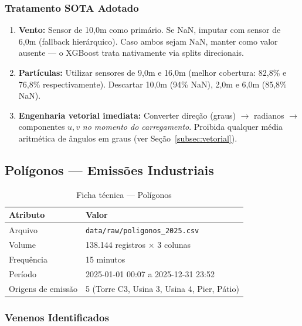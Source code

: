 \documentclass[12pt, a4paper]{article}
\newcommand{\arquivo}[1]{\texttt{#1}}
\begin{document}
\subsubsection{Tratamento SOTA Adotado}

\begin{enumerate}
    \item \textbf{Vento:} Sensor de 10,0m como primário. Se NaN, imputar com
          sensor de 6,0m (fallback hierárquico). Caso ambos sejam NaN, manter
          como valor ausente — o XGBoost trata nativamente via splits
          direcionais.
    \item \textbf{Partículas:} Utilizar sensores de 9,0m e 16,0m (melhor
          cobertura: 82,8\% e 76,8\% respectivamente). Descartar 10,0m (94\%
          NaN), 2,0m e 6,0m (85,8\% NaN).
    \item \textbf{Engenharia vetorial imediata:} Converter direção (graus)
          $\to$ radianos $\to$ componentes $u, v$ \textit{no momento do
          carregamento}. Proibida qualquer média aritmética de ângulos em
          graus (ver Seção~\ref{subsec:vetorial}).
\end{enumerate}

\subsection{Polígonos — Emissões Industriais}
\label{subsec:poligonos}

\begin{table}[H]
\centering
\caption{Ficha técnica — Polígonos}
\label{tab:poly_ficha}
\begin{tabular}{@{}ll@{}}
\toprule
\textbf{Atributo}       & \textbf{Valor} \\
\midrule
Arquivo                  & \arquivo{data/raw/poligonos\_2025.csv} \\
Volume                   & 138.144 registros $\times$ 3 colunas \\
Frequência               & 15 minutos \\
Período                  & 2025-01-01 00:07 a 2025-12-31 23:52 \\
Origens de emissão       & 5 (Torre C3, Usina 3, Usina 4, Pier, Pátio) \\
\bottomrule
\end{tabular}
\end{table}

\subsubsection{Venenos Identificados}
\end{document}
